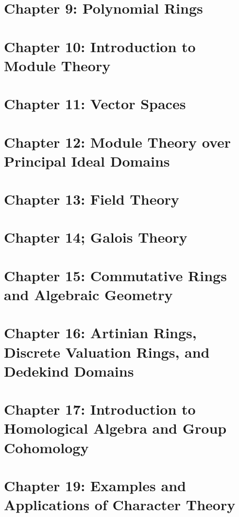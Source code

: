 \documentclass[11pt]{article}
\theoremstyle{definition}
\theoremstyle{remark}
\numberwithin{equation}{section}
\numberwithin{thm}{subsection}
\begin{document}
\newpage

\section{Chapter 9: Polynomial Rings}

\newpage

\section{Chapter 10: Introduction to Module Theory}

\newpage

\section{Chapter 11: Vector Spaces}

\newpage
\section{Chapter 12: Module Theory over Principal Ideal Domains}

\newpage

\section{Chapter 13: Field Theory}

\newpage

\section{Chapter 14; Galois Theory}

\newpage


\section{Chapter 15: Commutative Rings and Algebraic Geometry}

\newpage

\section{Chapter 16: Artinian Rings, Discrete Valuation Rings, and Dedekind Domains}


\newpage

\section{Chapter 17: Introduction to Homological Algebra and Group Cohomology}

\newpage



\section{Chapter 19: Examples and Applications of Character Theory}
\end{document}
